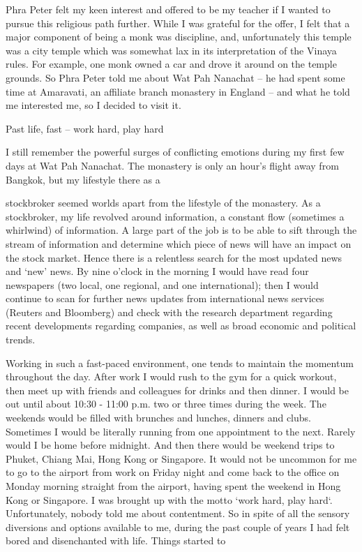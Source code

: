 Phra Peter felt my keen interest and offered to be my teacher if I
wanted to pursue this religious path further. While I was grateful for
the offer, I felt that a major component of being a monk was discipline, 
and, unfortunately this temple was a city temple which was somewhat lax
in its interpretation of the Vinaya rules. For example, one monk owned a
car and drove it around on the temple grounds. So Phra Peter told me
about Wat Pah Nanachat -- he had spent some time at Amaravati, an
affiliate branch monastery in England -- and what he told me interested
me, so I decided to visit it. 

Past life, fast -- work hard, play hard

I still remember the powerful surges of conflicting emotions during my
first few days at Wat Pah Nanachat. The monastery is only an hour's
flight away from Bangkok, but my lifestyle there as a

stockbroker seemed worlds apart from the lifestyle of the monastery. As
a stockbroker, my life revolved around information, a constant flow
 (sometimes a whirlwind) of information. A large part of the job is to be
able to sift through the stream of information and determine which piece
of news will have an impact on the stock market. Hence there is a
relentless search for the most updated news and `new' news. By nine
o'clock in the morning I would have read four newspapers (two local, one
regional, and one international); then I would continue to scan for
further news updates from international news services (Reuters and
Bloomberg) and check with the research department regarding recent
developments regarding companies, as well as broad economic and
political trends. 

Working in such a fast-paced environment, one tends to maintain the
momentum throughout the day. After work I would rush to the gym for a
quick workout, then meet up with friends and colleagues for drinks and
then dinner. I would be out until about 10:30 - 11:00 p.m. two or three
times during the week. The weekends would be filled with brunches and
lunches, dinners and clubs. Sometimes I would be literally running from
one appointment to the next. Rarely would I be home before midnight. And
then there would be weekend trips to Phuket, Chiang Mai, Hong Kong or
Singapore. It would not be uncommon for me to go to the airport from
work on Friday night and come back to the office on Monday morning
straight from the airport, having spent the weekend in Hong Kong or
Singapore. I was brought up with the motto `work hard, play hard`. 
Unfortunately, nobody told me about contentment. So in spite of all the
sensory diversions and options available to me, during the past couple
of years I had felt bored and disenchanted with life. Things started to

